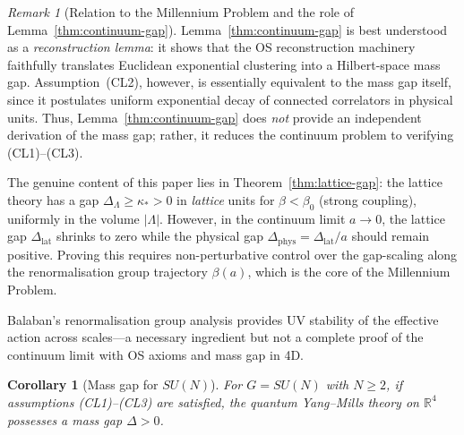\documentclass[12pt,a4paper]{article}
\theoremstyle{definition}
\theoremstyle{plain}
\newtheorem{corollary}[definition]{Corollary}
\theoremstyle{remark}
\newtheorem{remark}[definition]{Remark}
\begin{document}
\begin{remark}[Relation to the Millennium Problem and the role of Lemma~\ref{thm:continuum-gap}]
Lemma~\ref{thm:continuum-gap} is best understood as a \emph{reconstruction lemma}: it shows that the OS reconstruction machinery faithfully translates Euclidean exponential clustering into a Hilbert-space mass gap. Assumption~(CL2), however, is essentially equivalent to the mass gap itself, since it postulates uniform exponential decay of connected correlators in physical units. Thus, Lemma~\ref{thm:continuum-gap} does \emph{not} provide an independent derivation of the mass gap; rather, it reduces the continuum problem to verifying (CL1)--(CL3).

The genuine content of this paper lies in Theorem~\ref{thm:lattice-gap}: the lattice theory has a gap $\Delta_\Lambda \geq \kappa_* > 0$ in \emph{lattice} units for $\beta < \beta_0$ (strong coupling), uniformly in the volume $|\Lambda|$. However, in the continuum limit $a \to 0$, the lattice gap $\Delta_{\mathrm{lat}}$ shrinks to zero while the physical gap $\Delta_{\mathrm{phys}} = \Delta_{\mathrm{lat}}/a$ should remain positive. Proving this requires non-perturbative control over the gap-scaling along the renormalisation group trajectory $\beta(a)$, which is the core of the Millennium Problem.

Balaban's renormalisation group analysis \cite{Balaban1985a, Balaban1985b, Balaban1984c} provides UV stability of the effective action across scales---a necessary ingredient but not a complete proof of the continuum limit with OS axioms and mass gap in 4D.
\end{remark}

\begin{corollary}[Mass gap for $SU(N)$]
For $G = SU(N)$ with $N \geq 2$, if assumptions (CL1)--(CL3) are satisfied, the quantum Yang--Mills theory on $\mathbb{R}^4$ possesses a mass gap $\Delta > 0$.
\end{corollary}

\end{document}
